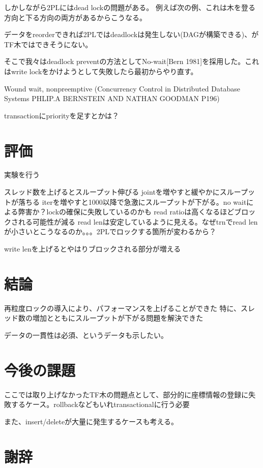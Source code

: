 \documentclass[a4paper]{jreport}	%
\begin{document}
しかしながら2PLにはdead lockの問題がある。
例えば次の例、これは木を登る方向と下る方向の両方があるからこうなる。

データをreorderできれば2PLではdeadlockは発生しない(DAGが構築できる)、がTF木ではできそうにない。

そこで我々はdeadlock preventの方法としてNo-wait[Bern 1981]を採用した。これはwrite lockをかけようとして失敗したら最初からやり直す。

Wound wait, nonpreemptive (Concurrency Control in Distributed Database Systems PHLIP.A BERNSTEIN AND NATHAN GOODMAN P196)

transactionにpriorityを足すとかは？



\chapter{評価}
実験を行う

スレッド数を上げるとスループット伸びる
jointを増やすと緩やかにスループットが落ちる
iterを増やすと1000以降で急激にスループットが下がる。no waitによる弊害か？lockの確保に失敗しているのかも
read ratioは高くなるほどブロックされる可能性が減る
read lenは安定しているように見える。なぜtrnでread lenが小さいとこうなるのか。。。2PLでロックする箇所が変わるから？

write lenを上げるとやはりブロックされる部分が増える



\chapter{結論}
再粒度ロックの導入により、パフォーマンスを上げることができた
特に、スレッド数の増加とともにスループットが下がる問題を解決できた

データの一貫性は必須、というデータも示したい。

\chapter{今後の課題}
ここでは取り上げなかったTF木の問題点として、部分的に座標情報の登録に失敗するケース。rollbackなどもいれtransactionalに行う必要

また、insert/deleteが大量に発生するケースも考える。


\chapter*{謝辞}
\end{document}
